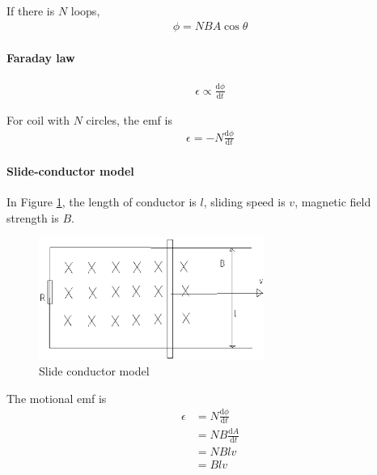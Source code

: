             If there is $N$ loops, 
            \begin{align}
                \phi = N B A \cos\theta
            \end{align}

        \paragraph{Faraday law}
            \begin{align}
                \epsilon \propto \frac{\mathrm{d} \phi}{\mathrm{d} t}
            \end{align}

            For coil with $N$ circles, the emf is
            \begin{align}
                \epsilon = -N \frac{\mathrm{d} \phi}{\mathrm{d} t}
            \end{align}

        
        \paragraph{Slide-conductor model}
            In Figure \ref{sli_con_mod}, the length of conductor is $l$, sliding speed is $v$, magnetic field strength is $B$.
            \begin{figure}[H]
                \begin{center}
                    \includegraphics[height=4cm]{electromagnetism_charts/slide_cond.eps}
                \end{center}
                \caption{Slide conductor model}
                \label{sli_con_mod}
            \end{figure}

            The motional emf is
            \begin{align}
                \epsilon &= N \frac{\mathrm{d} \phi}{\mathrm{d} t} \\
                         &= N B \frac{\mathrm{d} A}{\mathrm{d} t} \\
                         &= N B l v \\
                         &= B l v
            \end{align}

